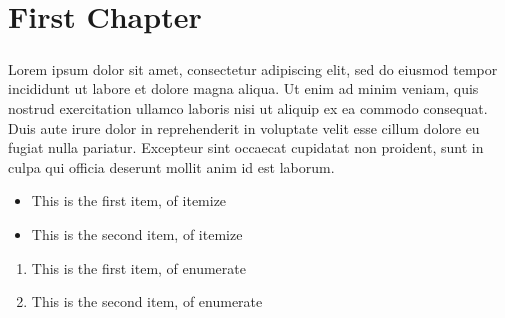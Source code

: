 \chapter{First Chapter}
    \paragraph{}Lorem ipsum dolor sit amet, consectetur adipiscing elit, sed do eiusmod tempor incididunt ut labore et dolore magna aliqua.
    Ut enim ad minim veniam, quis nostrud exercitation ullamco laboris nisi ut aliquip ex ea commodo consequat. Duis aute irure dolor in
    reprehenderit in voluptate velit esse cillum dolore eu fugiat nulla pariatur. Excepteur sint occaecat cupidatat non proident, sunt in
    culpa qui officia deserunt mollit anim id est laborum. \cite{article-full}

    \begin{itemize}
        \item This is the first item, of itemize
        \item This is the second item, of itemize
    \end{itemize}
    
    \begin{enumerate}
        \item This is the first item, of enumerate
        \item This is the second item, of enumerate
    \end{enumerate}
    
\newpage
